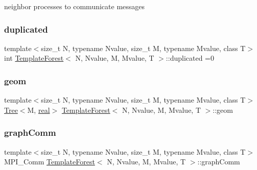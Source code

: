 neighbor processes to communicate messages \mbox{\label{classTemplateForest_a97bc83d3ecc6492e272230f00fb0b9f5}} 
\subsubsection{\texorpdfstring{duplicated}{duplicated}}
{\footnotesize\ttfamily template$<$size\+\_\+t N, typename Nvalue, size\+\_\+t M, typename Mvalue, class T$>$ \\
int \mbox{\hyperlink{classTemplateForest}{Template\+Forest}}$<$ N, Nvalue, M, Mvalue, T $>$\+::duplicated =0\hspace{0.3cm}{\ttfamily [private]}}

\mbox{\label{classTemplateForest_a63125f7155297d70f8f189ffb17c9822}} 
\subsubsection{\texorpdfstring{geom}{geom}}
{\footnotesize\ttfamily template$<$size\+\_\+t N, typename Nvalue, size\+\_\+t M, typename Mvalue, class T$>$ \\
\mbox{\hyperlink{classTree}{Tree}}$<$M, \mbox{\hyperlink{definitions_8h_aedc0ad84d1e764530814f57ad931d02a}{real}}$>$ \mbox{\hyperlink{classTemplateForest}{Template\+Forest}}$<$ N, Nvalue, M, Mvalue, T $>$\+::geom\hspace{0.3cm}{\ttfamily [private]}}

\mbox{\label{classTemplateForest_a55864067b34cf9807be0f42abb211b68}} 
\subsubsection{\texorpdfstring{graph\+Comm}{graphComm}}
{\footnotesize\ttfamily template$<$size\+\_\+t N, typename Nvalue, size\+\_\+t M, typename Mvalue, class T$>$ \\
M\+P\+I\+\_\+\+Comm \mbox{\hyperlink{classTemplateForest}{Template\+Forest}}$<$ N, Nvalue, M, Mvalue, T $>$\+::graph\+Comm\hspace{0.3cm}{\ttfamily [private]}}

